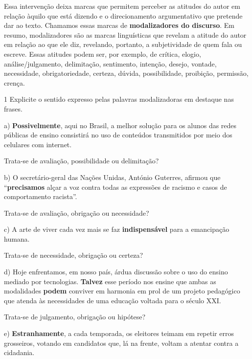 Essa intervenção deixa marcas que permitem perceber as atitudes do autor
em relação àquilo que está dizendo e o direcionamento argumentativo que
pretende dar ao texto. Chamamos essas marcas de \textbf{modalizadores do
discurso}. Em resumo, modalizadores são as marcas linguísticas que
revelam a atitude do autor em relação ao que ele diz, revelando,
portanto, a subjetividade de quem fala ou escreve. Essas atitudes podem
ser, por exemplo, de crítica, elogio, análise/julgamento, delimitação,
sentimento, intenção, desejo, vontade, necessidade, obrigatoriedade,
certeza, dúvida, possibilidade, proibição, permissão, crença.


\num{1} Explicite o sentido expresso pelas palavras modalizadoras em
destaque nas frases.

a) \textbf{Possivelmente}, aqui no Brasil, a melhor solução para os
alunos das redes públicas de ensino consistirá no uso de conteúdos
transmitidos por meio dos celulares com internet.

Trata-se de avaliação, possibilidade ou delimitação?


b) O secretário-geral das Nações Unidas, António Guterres, afirmou que
``\textbf{precisamos} alçar a voz contra todas as expressões de racismo
e casos de comportamento racista''.

Trata-se de avaliação, obrigação ou necessidade?


c) A arte de viver cada vez mais se faz \textbf{indispensável} para a
emancipação humana.

Trata-se de necessidade, obrigação ou certeza?


d) Hoje enfrentamos, em nosso país, árdua discussão sobre o uso do
ensino mediado por tecnologias. \textbf{Talvez} esse período nos ensine
que ambas as modalidades \textbf{podem} conviver em harmonia em prol de
um projeto pedagógico que atenda às necessidades de uma educação voltada
para o século XXI.

Trata-se de julgamento, obrigação ou hipótese?


e) \textbf{Estranhamente}, a cada temporada, os eleitores teimam em
repetir erros grosseiros, votando em candidatos que, lá na frente,
voltam a atentar contra a cidadania.


